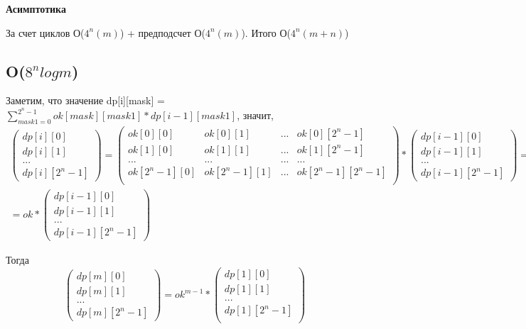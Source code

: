 \textbf{Асимптотика}

За счет циклов О($4^n(m)$) + предподсчет О($4^n(m)$). Итого О($4^n(m + n)$)
\subsection*{O($8^nlog m$)}
Заметим, что значение dp[i][mask] = $\sum\limits_{mask1 = 0}^{2^n -1}ok[mask][mask1]*dp[i-1][mask1]$, значит,\\
\begin{multline*}
    \begin{pmatrix}
        dp[i][0]\\
        dp[i][1]\\
        ... \\
        dp[i][2^n - 1]
       \end{pmatrix} = 
       \begin{pmatrix}
        ok[0][0] & ok[0][1] & ... & ok[0][2^n - 1]\\
        ok[1][0] & ok[1][1] & ... & ok[1][2^n - 1]\\
        ... & ... & ... & ... \\
       ok[2^n - 1][0] & ok[2^n - 1][1] & ... & ok[2^n - 1][2^n - 1]\\
       \end{pmatrix} * \begin{pmatrix}
        dp[i - 1][0]\\
        dp[i - 1][1]\\
        ... \\
        dp[i - 1][2^n - 1]
    \end{pmatrix} = \\
    = ok * \begin{pmatrix}
        dp[i - 1][0]\\
        dp[i - 1][1]\\
        ... \\
        dp[i - 1][2^n - 1]
    \end{pmatrix}
\end{multline*}


Тогда
$$\begin{pmatrix}
 dp[m][0]\\
 dp[m][1]\\
 ... \\
 dp[m][2^n - 1]
\end{pmatrix} = ok^{m-1}* \begin{pmatrix}
 dp[1][0]\\
 dp[1][1]\\
 ... \\
 dp[1][2^n - 1] \\ 
\end{pmatrix}$$

